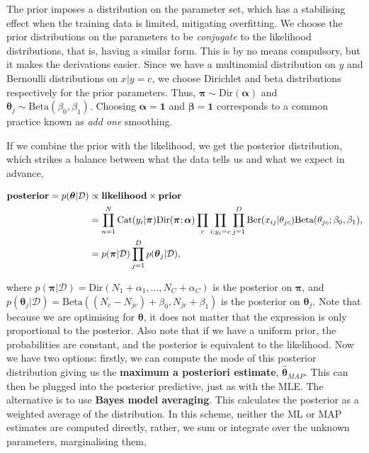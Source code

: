 \documentclass[11pt]{amsart}
\begin{document}
The prior imposes a distribution on the parameter set, which has a stabilising effect when the training data is limited, mitigating overfitting. We choose the prior distributions on the parameters to be \emph{conjugate} to the likelihood distributions, that is, having a similar form. This is by no means compulsory, but it makes the derivations easier. Since we have a multinomial distribution on $y$ and Bernoulli distributions on $x|y=c$, we choose Dirichlet and beta distributions respectively for the prior parameters. Thus, $\boldsymbol\pi \sim \text{Dir}(\boldsymbol\alpha)$ and $\boldsymbol\theta_j \sim \text{Beta}(\beta_0, \beta_1)$. Choosing $\boldsymbol\alpha = \mathbf{1}$ and $\boldsymbol\beta = \mathbf{1}$ corresponds to a common practice known as \emph{add one} smoothing.

If we combine the prior with the likelihood, we get the posterior distribution, which strikes a balance between what the data tells us and what we expect in advance,

\begin{align}
\textbf{posterior} = p(\boldsymbol\theta|\mathcal{D}) &\propto \textbf{likelihood} \times \textbf{prior} \notag \\
&= \prod_{n=1}^N\text{Cat}(y_i|\boldsymbol\pi)\text{Dir}(\boldsymbol\pi;\boldsymbol\alpha)\prod_{c}\prod_{i:y_i = c}\prod_{j = 1}^D \text{Ber}(x_{ij}|\theta_{jc})\text{Beta}(\theta_{jc};\beta_0, \beta_1), \notag \\
&= p(\boldsymbol\pi|\mathcal{D})\prod_{j = 1}^D p(\boldsymbol\theta_{j}|\mathcal{D}), \notag
\end{align}

where $p(\boldsymbol\pi|\mathcal{D}) = \text{Dir}(N_1 + \alpha_1, \dots, N_C + \alpha_C)$ is the posterior on $\boldsymbol\pi$, and $p(\boldsymbol\theta_{j}|\mathcal{D}) = \text{Beta}((N_c - N_{jc}) + \beta_0, N_{jc} + \beta_1)$ is the posterior on $\boldsymbol\theta_{j}$. Note that because we are optimising for $\boldsymbol\theta$, it does not matter that the expression is only proportional to the posterior. Also note that if we have a uniform prior, the probabilities are constant, and the posterior is equivalent to the likelihood. Now we have two options: firstly, we can compute the mode of this posterior distribution giving us the \textbf{maximum a posteriori estimate}, $\hat{\boldsymbol\theta}_{MAP}$. This can then be plugged into the posterior predictive, just as with the MLE. The alternative is to use \textbf{Bayes model averaging}. This calculates the posterior as a weighted average of the distribution. In this scheme, neither the ML or MAP estimates are computed directly, rather, we sum or integrate over the unknown parameters, marginalising them,
\end{document}
